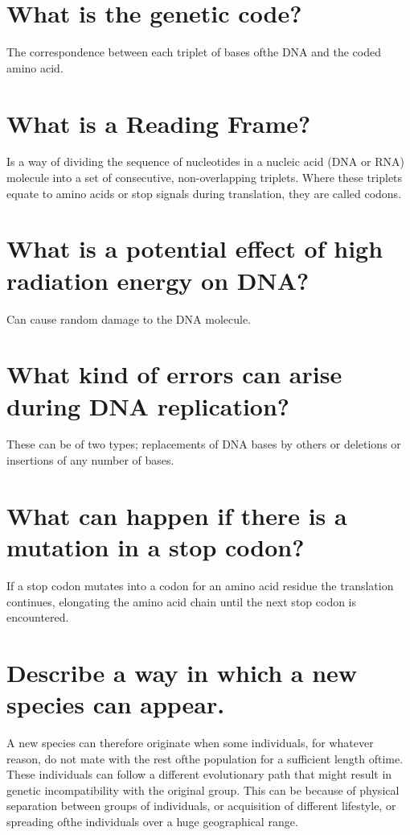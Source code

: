 \documentclass[12pt,letterpaper]{article}
\begin{document}
\bigskip

\section{ What is the genetic code?}
The correspondence between each triplet of bases ofthe DNA and the coded amino acid.

\section{What is a Reading Frame?}
Is a way of dividing the sequence of nucleotides in a nucleic acid (DNA or RNA) molecule into a set of consecutive, non-overlapping triplets. Where these triplets equate to amino acids or stop signals during translation, they are called codons.

\section{What is a potential effect of high radiation energy on DNA?}
Can cause random damage to the DNA molecule.

\section{What kind of errors can arise during DNA replication?}
These can be of two types; replacements of DNA bases by others or deletions or insertions of any number of bases.

\section{What can happen if there is a mutation in a stop codon?}
If a stop codon mutates into a codon for an amino acid residue the translation continues, elongating the amino acid chain until the next stop codon is encountered.

\section{Describe a way in which a new species can appear.}
A new species can therefore originate when some individuals, for whatever reason, do not mate with the rest ofthe population for a sufficient length oftime. These individuals can follow a different evolutionary path that might result in genetic incompatibility with the original group. This can be because of physical separation between groups of individuals, or acquisition of different lifestyle, or spreading ofthe individuals over a huge geographical range.
\end{document}
